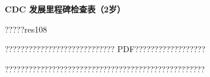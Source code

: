 \documentclass[11pt]{article}
\begin{document}
{\color[HTML]{0A84FF}\LARGE\bfseries CDC 发展里程碑检查表（2岁）\par}
{\color[HTML]{667085}\small ?????res108\par}
\vspace{1em}
???????????????????????????? PDF??????????????????

???????????????????????????????????????????????????
\end{document}
